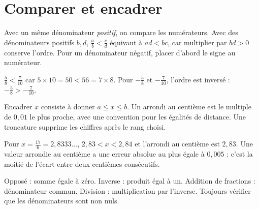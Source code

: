 \documentclass[../cours_3e.tex]{subfiles}
\begin{document}
\section{Comparer et encadrer}
Avec un même dénominateur \emph{positif}, on compare les numérateurs. Avec des dénominateurs positifs $b,d$, $\frac ab<\frac cd$ équivaut à $ad<bc$, car multiplier par $bd>0$ conserve l'ordre. Pour un dénominateur négatif, placer d'abord le signe au numérateur.
\begin{exemple}
$\frac58<\frac7{10}$ car $5\times10=50<56=7\times8$. Pour $-\frac58$ et $-\frac7{10}$, l'ordre est inversé : $-\frac58>-\frac7{10}$.
\end{exemple}
\begin{definition}
Encadrer $x$ consiste à donner $a\leq x\leq b$. Un arrondi au centième est le multiple de $0{,}01$ le plus proche, avec une convention pour les égalités de distance. Une troncature supprime les chiffres après le rang choisi.
\end{definition}
Pour $x=\frac{17}{6}=2{,}8333\ldots$, $2{,}83<x<2{,}84$ et l'arrondi au centième est $2{,}83$. Une valeur arrondie au centième a une erreur absolue au plus égale à $0{,}005$ : c'est la moitié de l'écart entre deux centièmes consécutifs.
\begin{retenir}
Opposé : somme égale à zéro. Inverse : produit égal à un. Addition de fractions : dénominateur commun. Division : multiplication par l'inverse. Toujours vérifier que les dénominateurs sont non nuls.
\end{retenir}
\end{document}
